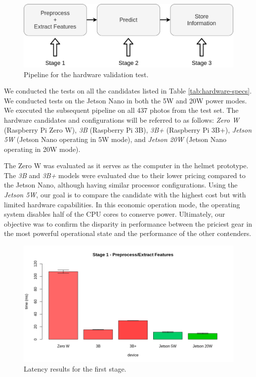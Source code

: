 \begin{figure}[h!]
    \centering
    \includegraphics[width = .7\linewidth]{Figures/hw-test-pipeline.png}
    \caption{Pipeline for the hardware validation test.}
    \label{fig:hwtest-pipeline}
\end{figure}

We conducted the tests on all the candidates listed in Table \ref{tab:hardware-specs}. We conducted tests on the Jetson Nano in both the 5W and 20W power modes. We executed the subsequent pipeline on all 437 photos from the test set. The hardware candidates and configurations will be referred to as follows: \textit{Zero W} (Raspberry Pi Zero W), \textit{3B} (Raspberry Pi 3B), \textit{3B+} (Raspberry Pi 3B+), \textit{Jetson 5W} (Jetson Nano operating in 5W mode), and \textit{Jetson 20W} (Jetson Nano operating in 20W mode).

The Zero W was evaluated as it serves as the computer in the helmet prototype. The \textit{3B} and \textit{3B+} models were evaluated due to their lower pricing compared to the Jetson Nano, although having similar processor configurations. Using the \textit{Jetson 5W}, our goal is to compare the candidate with the highest cost but with limited hardware capabilities. In this economic operation mode, the operating system disables half of the CPU cores to conserve power. Ultimately, our objective was to confirm the disparity in performance between the priciest gear in the most powerful operational state and the performance of the other contenders.

\begin{figure}[h]
    \centering
    \includegraphics[width = .8\linewidth]{Figures/HW-stage1.png}
    \caption{Latency results for the first stage.}
    \label{fig:hw-stage1}
\end{figure}

